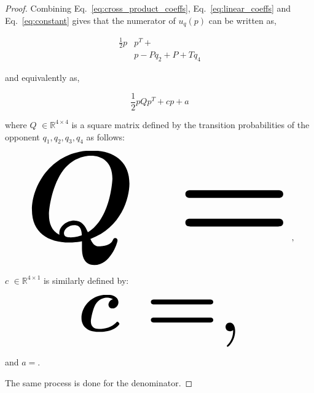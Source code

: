 \documentclass[10pt]{article}
\newcommand{\R}{\mathbb{R}}
\providecommand{\DIFaddbegin}{} %
\providecommand{\DIFaddend}{} %
\providecommand{\DIFdelbegin}{} %
\providecommand{\DIFdelend}{} %
\newcommand{\DIFscaledelfig}{0.5}
\newlength{\DIFdelgraphicswidth} %
\newlength{\DIFdelgraphicsheight} %
\newcommand{\DIFaddincludegraphics}[2][]{{\color{blue}\fbox{\DIFOincludegraphics[#1]{#2}}}} %
\newcommand{\DIFdelincludegraphics}[2][]{%
\sbox{\DIFdelgraphicsbox}{\DIFOincludegraphics[#1]{#2}}%
\settoboxwidth{\DIFdelgraphicswidth}{\DIFdelgraphicsbox} %
\settoboxtotalheight{\DIFdelgraphicsheight}{\DIFdelgraphicsbox} %
\scalebox{\DIFscaledelfig}{%
\parbox[b]{\DIFdelgraphicswidth}{\usebox{\DIFdelgraphicsbox}\\[-\baselineskip] \rule{\DIFdelgraphicswidth}{0em}}\llap{\resizebox{\DIFdelgraphicswidth}{\DIFdelgraphicsheight}{%
\setlength{\unitlength}{\DIFdelgraphicswidth}%
\begin{picture}(1,1)%
\thicklines\linethickness{2pt} %
{\color[rgb]{1,0,0}\put(0,0){\framebox(1,1){}}}%
{\color[rgb]{1,0,0}\put(0,0){\line( 1,1){1}}}%
{\color[rgb]{1,0,0}\put(0,1){\line(1,-1){1}}}%
\end{picture}%
}\hspace*{3pt}}} %
} %
\DeclareRobustCommand{\DIFaddbegin}{\DIFOaddbegin \let\includegraphics\DIFaddincludegraphics} %
\DeclareRobustCommand{\DIFaddend}{\DIFOaddend \let\includegraphics\DIFOincludegraphics} %
\DeclareRobustCommand{\DIFdelbegin}{\DIFOdelbegin \let\includegraphics\DIFdelincludegraphics} %
\DeclareRobustCommand{\DIFdelend}{\DIFOaddend \let\includegraphics\DIFOincludegraphics} %
\begin{document}
\begin{proof}
    Combining Eq.~\ref{eq:cross_product_coeffs}, Eq.~\ref{eq:linear_coeffs} and
    Eq.~\ref{eq:constant} gives that the numerator of \(u_q(p)\) can be written
    as,

    \begingroup
    \tiny\boldmath
    \DIFdelbegin %
\DIFdelend \DIFaddbegin \begin{align*}
        \frac{1}{2}p &  p^T +  \\
        &  p - P q_{2} + P + T q_{4}
    \end{align*}\DIFaddend 
    \endgroup

    and equivalently as,

    \[\frac{1}{2}pQp^T + cp + a\]

    where \(Q\) \(\in \R^{4\times4}\) is a square matrix defined by the
    transition probabilities of the opponent \(q_1, q_2, q_3, q_4\) as follows:

    \DIFdelbegin %
\DIFdelend \DIFaddbegin \begin{equation*}
        \resizebox{0.9\linewidth}{!}{\arraycolsep=2.5pt%
        \boldmath\(
        Q = \)},
    \end{equation*}\DIFaddend 

    \(c\) \(\in \R^{4 \times 1}\) is similarly defined by:

    \DIFdelbegin %
\DIFdelend \DIFaddbegin \begin{equation*}
        \resizebox{0.55\linewidth}{!}{\arraycolsep=2.5pt%
        \boldmath\(c = \),}
    \end{equation*}\DIFaddend 

    and \(a = \).

    The same process is done for the denominator.
\end{proof}
\end{document}
